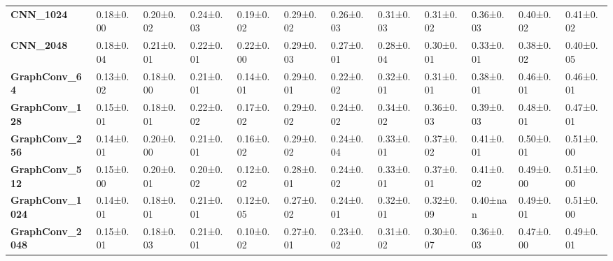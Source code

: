 \begin{tabular}{llllllllllll}
\textbf{CNN\_1024      } &   0.18±0.00 &  0.20±0.02 &  0.24±0.03 &  0.19±0.02 &  0.29±0.02 &  0.26±0.03 &  0.31±0.03 &  0.31±0.02 &  0.36±0.03 &   0.40±0.02 &   0.41±0.02 \\
\textbf{CNN\_2048      } &   0.18±0.04 &  0.21±0.01 &  0.22±0.01 &  0.22±0.00 &  0.29±0.03 &  0.27±0.01 &  0.28±0.04 &  0.30±0.01 &  0.33±0.01 &   0.38±0.02 &   0.40±0.05 \\
\textbf{GraphConv\_64  } &   0.13±0.02 &  0.18±0.00 &  0.21±0.01 &  0.14±0.01 &  0.29±0.01 &  0.22±0.02 &  0.32±0.01 &  0.31±0.01 &  0.38±0.01 &   0.46±0.01 &   0.46±0.01 \\
\textbf{GraphConv\_128 } &   0.15±0.01 &  0.18±0.01 &  0.22±0.02 &  0.17±0.02 &  0.29±0.02 &  0.24±0.02 &  0.34±0.02 &  0.36±0.03 &  0.39±0.03 &   0.48±0.01 &   0.47±0.01 \\
\textbf{GraphConv\_256 } &   0.14±0.01 &  0.20±0.00 &  0.21±0.01 &  0.16±0.02 &  0.29±0.02 &  0.24±0.04 &  0.33±0.01 &  0.37±0.02 &  0.41±0.01 &   0.50±0.01 &   0.51±0.00 \\
\textbf{GraphConv\_512 } &   0.15±0.00 &  0.20±0.01 &  0.20±0.02 &  0.12±0.02 &  0.28±0.01 &  0.24±0.02 &  0.33±0.01 &  0.37±0.01 &  0.41±0.02 &   0.49±0.00 &   0.51±0.00 \\
\textbf{GraphConv\_1024} &   0.14±0.01 &  0.18±0.01 &  0.21±0.01 &  0.12±0.05 &  0.27±0.02 &  0.24±0.01 &  0.32±0.01 &  0.32±0.09 &   0.40±nan &   0.49±0.01 &   0.51±0.00 \\
\textbf{GraphConv\_2048} &   0.15±0.01 &  0.18±0.03 &  0.21±0.01 &  0.10±0.02 &  0.27±0.01 &  0.23±0.02 &  0.31±0.02 &  0.30±0.07 &  0.36±0.03 &   0.47±0.00 &   0.49±0.01 \\
\bottomrule
\end{tabular}
